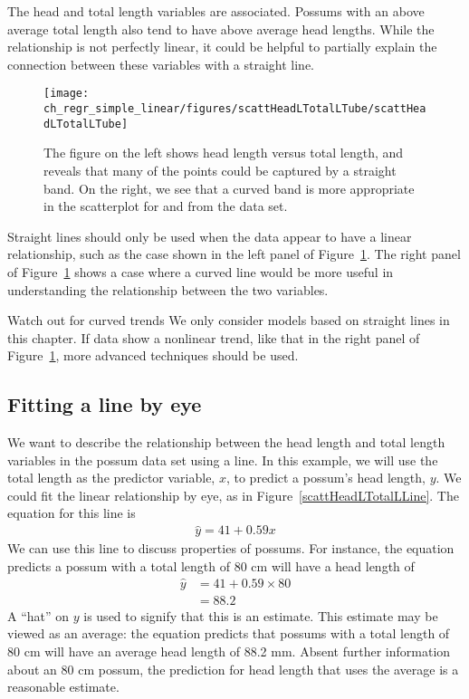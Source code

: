The head and total length variables are associated. Possums with an above average total length also tend to have above average head lengths. While the relationship is not perfectly linear, it could be helpful to partially explain the connection between these variables with a straight line.

\begin{figure}
   \centering
   \texttt{[image: ch\_regr\_simple\_linear/figures/scattHeadLTotalLTube/scattHeadLTotalLTube]}
   \caption{The figure on the left shows head length versus total length, and reveals that many of the points could be captured by a straight band. On the right, we see that a curved band is more appropriate in the scatterplot for  and  from the  data set.}
   \label{scattHeadLTotalLTube}
\end{figure}

Straight lines should only be used when the data appear to have a linear relationship, such as the case shown in the left panel of Figure~\ref{scattHeadLTotalLTube}. The right panel of Figure~\ref{scattHeadLTotalLTube} shows a case where a curved line would be more useful in understanding the relationship between the two variables.

\begin{caution}
{Watch out for curved trends}
{We only consider models based on straight lines in this chapter. If data show a nonlinear trend, like that in the right panel of Figure~\ref{scattHeadLTotalLTube}, more advanced techniques should be used.\vspace{0.7mm}}
\end{caution}

\textC{\newpage}

\subsection{Fitting a line by eye}

We want to describe the relationship between the head length and total length variables in the possum data set using a line. In this example, we will use the total length as the predictor variable, $x$, to predict a possum's head length, $y$. We could fit the linear relationship by eye, as in Figure~\ref{scattHeadLTotalLLine}. The equation for this line is
\begin{eqnarray}
\hat{y} = 41 + 0.59x
\label{headLLinModTotalL}
\end{eqnarray}
We can use this line to discuss properties of possums. For instance, the equation predicts a possum with a total length of 80 cm will have a head length of
\begin{align*}
\hat{y} &= 41 + 0.59\times 80 \\
	&= 88.2 %
\end{align*}
A ``hat'' on $y$ is used to signify that this is an estimate. This estimate may be viewed as an average: the equation predicts that possums with a total length of 80 cm will have an average head length of 88.2 mm. Absent further information about an 80 cm possum, the prediction for head length that uses the average is a reasonable estimate.

